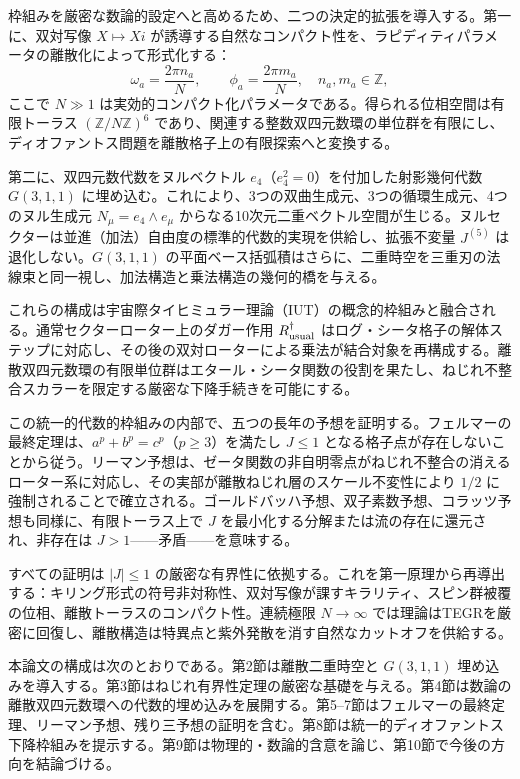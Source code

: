 \documentclass[a4paper]{article}
\theoremstyle{definition}
\begin{document}
枠組みを厳密な数論的設定へと高めるため、二つの決定的拡張を導入する。第一に、双対写像 $X \mapsto Xi$ が誘導する自然なコンパクト性を、ラピディティパラメータの離散化によって形式化する：
\[
\omega_a = \frac{2\pi n_a}{N}, \qquad \phi_a = \frac{2\pi m_a}{N}, \quad n_a,m_a \in \mathbb{Z},
\]
ここで $N \gg 1$ は実効的コンパクト化パラメータである。得られる位相空間は有限トーラス $(\mathbb{Z}/N\mathbb{Z})^6$ であり、関連する整数双四元数環の単位群を有限にし、ディオファントス問題を離散格子上の有限探索へと変換する。

第二に、双四元数代数をヌルベクトル $e_4$（$e_4^2 = 0$）を付加した射影幾何代数 $G(3,1,1)$ に埋め込む。これにより、3つの双曲生成元、3つの循環生成元、4つのヌル生成元 $N_\mu = e_4 \wedge e_\mu$ からなる10次元二重ベクトル空間が生じる。ヌルセクターは並進（加法）自由度の標準的代数的実現を供給し、拡張不変量 $J^{(5)}$ は退化しない。$G(3,1,1)$ の平面ベース括弧積はさらに、二重時空を三重刃の法線束と同一視し、加法構造と乗法構造の幾何的橋を与える。

これらの構成は宇宙際タイヒミュラー理論（IUT）の概念的枠組みと融合される。通常セクターローター上のダガー作用 $R_{\rm usual}^\dagger$ はログ・シータ格子の解体ステップに対応し、その後の双対ローターによる乗法が結合対象を再構成する。離散双四元数環の有限単位群はエタール・シータ関数の役割を果たし、ねじれ不整合スカラーを限定する厳密な下降手続きを可能にする。

この統一的代数的枠組みの内部で、五つの長年の予想を証明する。フェルマーの最終定理は、$a^p + b^p = c^p$（$p \geq 3$）を満たし $J \leq 1$ となる格子点が存在しないことから従う。リーマン予想は、ゼータ関数の非自明零点がねじれ不整合の消えるローター系に対応し、その実部が離散ねじれ層のスケール不変性により $1/2$ に強制されることで確立される。ゴールドバッハ予想、双子素数予想、コラッツ予想も同様に、有限トーラス上で $J$ を最小化する分解または流の存在に還元され、非存在は $J > 1$——矛盾——を意味する。

すべての証明は $|J| \leq 1$ の厳密な有界性に依拠する。これを第一原理から再導出する：キリング形式の符号非対称性、双対写像が課すキラリティ、スピン群被覆の位相、離散トーラスのコンパクト性。連続極限 $N \to \infty$ では理論はTEGRを厳密に回復し、離散構造は特異点と紫外発散を消す自然なカットオフを供給する。

本論文の構成は次のとおりである。第2節は離散二重時空と $G(3,1,1)$ 埋め込みを導入する。第3節はねじれ有界性定理の厳密な基礎を与える。第4節は数論の離散双四元数環への代数的埋め込みを展開する。第5--7節はフェルマーの最終定理、リーマン予想、残り三予想の証明を含む。第8節は統一的ディオファントス下降枠組みを提示する。第9節は物理的・数論的含意を論じ、第10節で今後の方向を結論づける。
\end{document}
